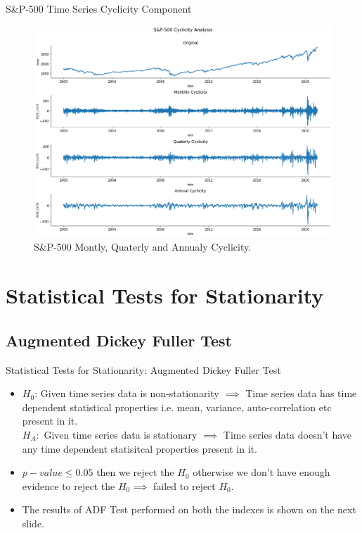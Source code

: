\documentclass{beamer}
\begin{document}
\begin{frame}{S\&P-500 Time Series Cyclicity Component}
	\begin{figure}
		\centering
		\includegraphics[width = 0.80 \textwidth]{images/S&P-500 Cyclicity Plot.png}
		\caption{S\&P-500 Montly, Quaterly and Annualy Cyclicity.}
		\label{fig:my_label}
	\end{figure}
\end{frame}

\section{Statistical Tests for Stationarity}
\subsection{Augmented Dickey Fuller Test}
\begin{frame}{Statistical Tests for Stationarity: Augmented Dickey Fuller Test}
	\begin{itemize}
		\item $H_{0}$: Given time series data is non-stationarity $\implies$ Time series data has time dependent statistical properties i.e. mean, variance, auto-correlation etc present in it.\\
		      $H_{A}:$ Given time series data is stationary $\implies$ Time series data doesn't have any time dependent statisitcal properties present in it.
		\item $p-value \le 0.05$ then we reject the $H_{0}$ otherwise we don't have enough evidence to reject the $H_{0} \implies$ failed to reject $H_{0}.$
		\item The results of ADF Test performed on both the indexes is shown on the next slide.
	\end{itemize}
\end{frame}
\end{document}
